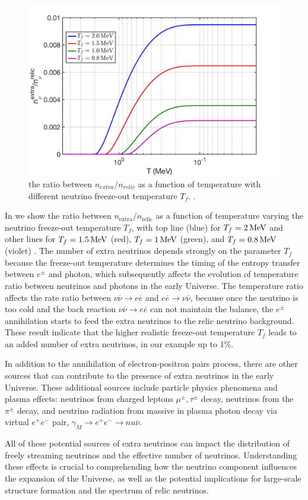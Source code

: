 \begin{figure}
\begin{center}
\includegraphics[width=0.8\linewidth]{./plots/ExtraNeutrinoRatio}
\caption{the ratio between $n_{extra}/n_{relic}$ as a function of temperature with different neutrino freeze-out temperature $T_f$. .}
\label{ExtraNeutrinoRatio}
\end{center}
\end{figure}


In  we show the ratio between $n_\mathrm{extra}/n_\mathrm{relic}$ as a function of temperature varying the neutrino freeze-out temperature $T_f$, with top line (blue) for $T_f=2\text{\,MeV}$ and other lines for $T_f=1.5\text{\,MeV}$ (red), $T_f=1 \text{\,MeV}$ (green), and  $T_f=0.8 \text{\,MeV}$ (violet) . The number of extra neutrinos depends strongly on the parameter $T_f$ because the freeze-out temperature determines the timing of the entropy transfer between $e^\pm$ and photon, which subsequently affects the evolution of temperature ratio between neutrinos and photons in the early Universe. The temperature ratio affects the rate ratio between $\nu\overline{\nu}\to e\overline{e}$ and $ e\overline{e}\to\nu\overline{\nu}$, because once the neutrino is too cold and the back reaction $\nu\overline{\nu}\to e\overline{e}$ can not maintain the balance, the $e^\pm$ annihilation starts to feed the extra neutrinos to the relic neutrino background. These result indicate  that the higher realistic freeze-out temperature $T_f$ leads to an added  number of extra neutrinos, in our example up to 1\%. 

In addition to the annihilation of electron-positron pairs process, there are other sources that can contribute to the presence of extra neutrinos in the early Universe. These additional sources include particle physics phenomena and plasma effects: neutrinos from charged leptons $\mu^\pm,\tau^\pm$ decay, neutrinos from the $\pi^\pm$ decay, and neutrino radiation from massive in plasma photon decay via virtual $e^+e^-$ pair, $\gamma_M\to e^+e^-\to nu\bar\nu$. 

All of these potential sources of extra neutrinos can impact the distribution of freely streaming neutrinos and the effective number of neutrinos. Understanding these effects is crucial to comprehending how the neutrino component influences the expansion of the Universe, as well as the potential implications for large-scale structure formation and the spectrum of relic neutrinos.
